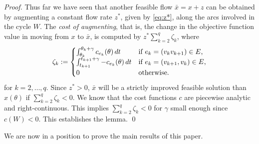 \documentclass{svjour3}                     \smartqed
\begin{document}
\begin{proof}
Thus far we have seen that another feasible flow $\bar{x}=x+z$ can be obtained by augmenting a constant flow rate $z^*$, given by \eqref{eq:z*}, along the arcs involved in the cycle
$W$. The \emph{cost of augmenting}, that is, the change in
the objective function value in moving from $x$ to $\bar{x}$, is computed by
 $z^*\sum_{k=2}^{q}{\zeta_k}$, where
\begin{align*}
\zeta_k:=\begin{cases}
                 \int_{\theta_{k}}^{\theta_{k}+\gamma}  {c_{e_k}(\theta)}\,dt & \hbox{if $e_k=(v_{k}v_{k+1})\in E$,}\\
                 \int_{t_{k+1}}^{t_{k+1}+\gamma} {-c_{e_k}(\theta)}\,dt & \hbox{if $e_k=(v_{k+1},v_{k})\in E$,}\\
		 0 & \hbox{otherwise.}
         \end{cases}
\end{align*}
for $k=2,\ldots,q$. Since $z^*>0$, $\bar{x}$ will be a strictly improved feasible solution than
$x(\theta)$ if $\sum_{k=2}^{q}{\zeta_k}<0$. We know that the cost functions $c$ are
piecewise analytic and right-continuous. This implies
$\sum_{k=2}^{q}{\zeta_k}<0$ for $\gamma$ small enough since $c(W)<0$.
This establishes the lemma.
\qed
\end{proof}

We are now in a position to prove the main results of this paper.
\end{document}
